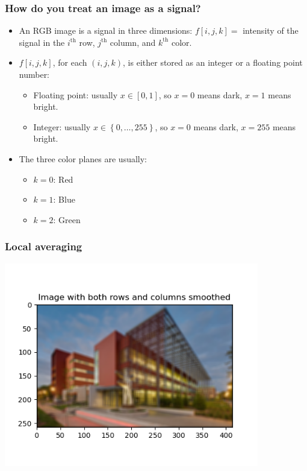 \documentclass{beamer}
\begin{document}
\begin{frame}
  \frametitle{How do you treat an image as a signal?}
  \begin{itemize}
  \item
    An RGB image is a signal in three dimensions: $f[i,j,k]=$
    intensity of the signal in the $i^{\textrm{th}}$ row,
    $j^{\textrm{th}}$ column, and $k^{\textrm{th}}$ color.
  \item
    $f[i,j,k]$, for each $(i,j,k)$, is either stored as an integer or
    a floating point number:
    \begin{itemize}
    \item Floating point: usually $x\in[0,1]$, so $x=0$ means dark,
      $x=1$ means bright.
    \item Integer: usually $x\in\left\{0,\ldots,255\right\}$, so
      $x=0$ means dark, $x=255$ means bright.
    \end{itemize}
  \item The three color planes are usually:
    \begin{itemize}
    \item $k=0$: Red
    \item $k=1$: Blue
    \item $k=2$: Green
    \end{itemize}
  \end{itemize}
\end{frame}
    
\begin{frame}
  \frametitle{Local averaging}
  \centerline{\includegraphics[height=3.5in]{mp1fig4.png}}
\end{frame}
\end{document}
